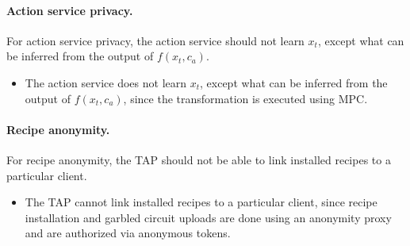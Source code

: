 \paragraph{Action service privacy.} For action service privacy, the action
service should not learn $x_t$, except what can be inferred from the output of
$f(x_t, c_a)$.
\begin{itemize}
  \item The action service does not learn $x_t$, except what can be inferred
    from the output of $f(x_t, c_a)$, since the transformation is executed using
    MPC.
\end{itemize}

\paragraph{Recipe anonymity.} For recipe anonymity, the TAP should not be able to link
installed recipes to a particular client.
\begin{itemize}
  \item The TAP cannot link installed recipes to a particular client, since recipe
    installation and garbled circuit uploads are done using an anonymity proxy
    and are authorized via anonymous tokens.
\end{itemize}

